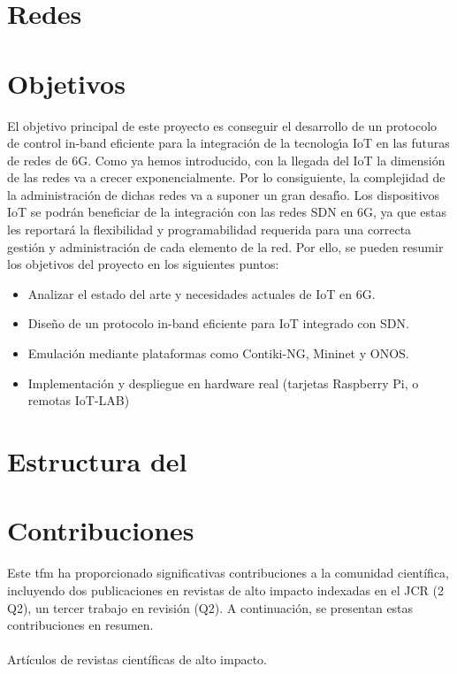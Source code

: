 \section{Redes }
\label{sec:6gIoT_sdn}


\section{Objetivos}
\label{sec:obj}

El objetivo principal de este proyecto es conseguir el desarrollo de un protocolo de control in-band eficiente
para la integración de la tecnologı́a IoT en las futuras de redes de 6G. Como ya hemos introducido, con la
llegada del IoT la dimensión de las redes va a crecer exponencialmente. Por lo consiguiente, la complejidad
de la administración de dichas redes va a suponer un gran desafı́o. Los dispositivos IoT se podrán beneficiar
de la integración con las redes SDN en 6G, ya que estas les reportará la flexibilidad y programabilidad
requerida para una correcta gestión y administración de cada elemento de la red. Por ello, se pueden resumir
los objetivos del proyecto en los siguientes puntos:

\begin{itemize}
    \item Analizar el estado del arte y necesidades actuales de IoT en 6G.
    \item Diseño de un protocolo in-band eficiente para IoT integrado con SDN.
    \item Emulación mediante plataformas como Contiki-NG, Mininet y ONOS.
    \item Implementación y despliegue en hardware real (tarjetas Raspberry Pi, o remotas IoT-LAB)
\end{itemize}





\section{Estructura del }
\label{sec:structure}



\section{Contribuciones}
\label{sec:contributions}


Este \gls*{tfm} ha proporcionado significativas contribuciones a la comunidad científica, incluyendo dos publicaciones en revistas de alto impacto indexadas en el JCR (2 Q2), un tercer trabajo en revisión (Q2). A continuación, se presentan estas contribuciones en resumen.\\
\\
Artículos de revistas científicas de alto impacto.

